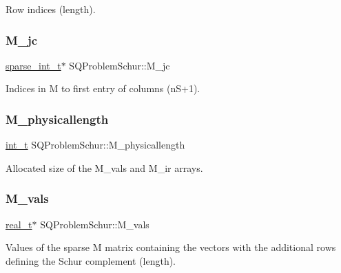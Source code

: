Row indices (length). \mbox{\label{class_s_q_problem_schur_a75e1d2d567b4a62f3cc509d6bbad13e8}} 
\subsubsection{\texorpdfstring{M\+\_\+jc}{M\_jc}}
{\footnotesize\ttfamily \hyperlink{_types_8hpp_aa5432b00c9081e2d62d7f38c32e4ed80}{sparse\+\_\+int\+\_\+t}$\ast$ S\+Q\+Problem\+Schur\+::\+M\+\_\+jc\hspace{0.3cm}{\ttfamily [protected]}}

Indices in M to first entry of columns (n\+S+1). \mbox{\label{class_s_q_problem_schur_afeff2901122ec7a4561f6bd451314e1e}} 
\subsubsection{\texorpdfstring{M\+\_\+physicallength}{M\_physicallength}}
{\footnotesize\ttfamily \hyperlink{_types_8hpp_ab6fd6105e64ed14a0c9281326f05e623}{int\+\_\+t} S\+Q\+Problem\+Schur\+::\+M\+\_\+physicallength\hspace{0.3cm}{\ttfamily [protected]}}

Allocated size of the M\+\_\+vals and M\+\_\+ir arrays. \mbox{\label{class_s_q_problem_schur_a2de9d718635c4a0195d9778c4694d268}} 
\subsubsection{\texorpdfstring{M\+\_\+vals}{M\_vals}}
{\footnotesize\ttfamily \hyperlink{qp_o_a_s_e_s__wrapper_8h_a0d00e2b3dfadee81331bbb39068570c4}{real\+\_\+t}$\ast$ S\+Q\+Problem\+Schur\+::\+M\+\_\+vals\hspace{0.3cm}{\ttfamily [protected]}}

Values of the sparse M matrix containing the vectors with the additional rows defining the Schur complement (length). \mbox{\label{class_s_q_problem_schur_a8a3424dd9a8ef8cce8f868838d76abda}} 
